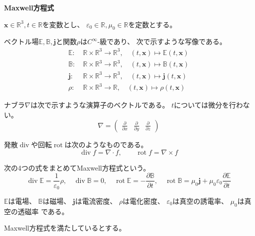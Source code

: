 \documentclass[12pt,b5paper]{ltjsarticle}
\DeclareMathOperator{\Rot}{rot}
\DeclareMathOperator{\Div}{div}
\begin{document}
\textbf{Maxwell方程式}

\hrulefill

$\bm{x}\in\mathbb{R}^3,t\in\mathbb{R}$を変数とし、
$\varepsilon_0\in\mathbb{R},\mu_0\in\mathbb{R}$を定数とする。

ベクトル場$\mathbb{E},\mathbb{B},\bm{j}$と関数$\rho$は$C^\infty$-級であり、
次で示すような写像である。
\begin{align}
 \mathbb{E} :&\ \mathbb{R}\times\mathbb{R}^3 \to \mathbb{R}^3, \quad (t,\bm{x})\mapsto \mathbb{E}(t,\bm{x})\\
  \mathbb{B} :&\ \mathbb{R}\times\mathbb{R}^3 \to \mathbb{R}^3, \quad (t,\bm{x})\mapsto \mathbb{B}(t,\bm{x})\\
  \bm{j} :&\ \mathbb{R}\times\mathbb{R}^3 \to \mathbb{R}^3, \quad (t,\bm{x})\mapsto \bm{j}(t,\bm{x})\\
  \mathbb{\rho} :&\ \mathbb{R}\times\mathbb{R}^3 \to \mathbb{R}, \quad (t,\bm{x})\mapsto \rho(t,\bm{x})
\end{align}

ナブラ$\nabla$は次で示すような演算子のベクトルである。
$t$については微分を行わない。
\begin{equation}
 \nabla = \begin{pmatrix} \frac{\partial}{\partial x} & \frac{\partial}{\partial y} & \frac{\partial}{\partial z} \end{pmatrix}
\end{equation}

発散$\Div$や回転$\Rot$は次のようなものである。
\begin{equation}
 \Div f = \nabla \cdot f
  ,\qquad
 \Rot f = \nabla \times f
\end{equation}

次の4つの式をまとめてMaxwell方程式という。
\begin{equation}
 \Div\mathbb{E} = \frac{1}{\varepsilon_0}\rho,
  \quad
 \Div\mathbb{B} = 0,
  \quad
 \Rot\mathbb{E} = -\frac{\partial \mathbb{B}}{\partial t},
  \quad
 \Rot\mathbb{B} = \mu_0\bm{j} + \mu_0\varepsilon_0\frac{\partial \mathbb{E}}{\partial t}
\end{equation}

$\mathbb{E}$は電場、
$\mathbb{B}$は磁場、
$\bm{j}$は電流密度、
$\rho$は電化密度、
$\varepsilon_0$は真空の誘電率、
$\mu_0$は真空の透磁率
である。



\hrulefill


Maxwell方程式を満たしているとする。
\end{document}
